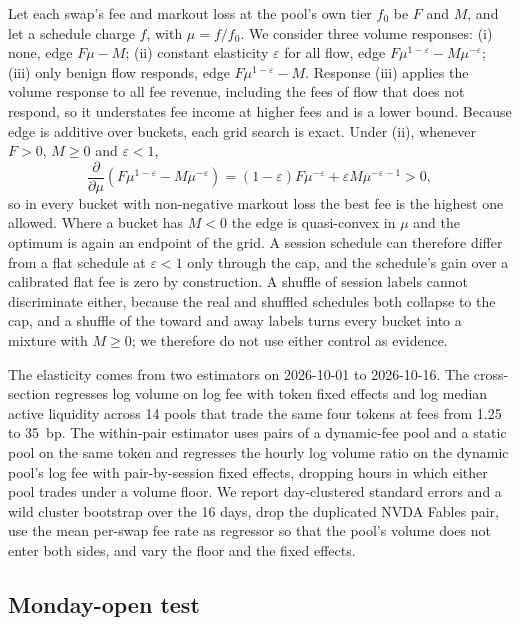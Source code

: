 \documentclass[11pt]{article}
\begin{document}
Let each swap's fee and markout loss at the pool's own tier $f_0$ be $F$ and $M$, and let a schedule charge $f$, with $\mu = f/f_0$. We consider three volume responses: (i) none, edge $F\mu - M$; (ii) constant elasticity $\varepsilon$ for all flow, edge $F\mu^{1-\varepsilon} - M\mu^{-\varepsilon}$; (iii) only benign flow responds, edge $F\mu^{1-\varepsilon} - M$. Response (iii) applies the volume response to all fee revenue, including the fees of flow that does not respond, so it understates fee income at higher fees and is a lower bound. Because edge is additive over buckets, each grid search is exact. Under (ii), whenever $F>0$, $M \geq 0$ and $\varepsilon < 1$,
\begin{equation}
\frac{\partial}{\partial \mu}\left(F\mu^{1-\varepsilon} - M\mu^{-\varepsilon}\right) = (1-\varepsilon) F \mu^{-\varepsilon} + \varepsilon M \mu^{-\varepsilon-1} > 0,
\end{equation}
so in every bucket with non-negative markout loss the best fee is the highest one allowed. Where a bucket has $M<0$ the edge is quasi-convex in $\mu$ and the optimum is again an endpoint of the grid. A session schedule can therefore differ from a flat schedule at $\varepsilon<1$ only through the cap, and the schedule's gain over a calibrated flat fee is zero by construction. A shuffle of session labels cannot discriminate either, because the real and shuffled schedules both collapse to the cap, and a shuffle of the toward and away labels turns every bucket into a mixture with $M \geq 0$; we therefore do not use either control as evidence.

The elasticity comes from two estimators on 2026-10-01 to 2026-10-16. The cross-section regresses log volume on log fee with token fixed effects and log median active liquidity across 14 pools that trade the same four tokens at fees from 1.25 to 35~bp. The within-pair estimator uses pairs of a dynamic-fee pool and a static pool on the same token and regresses the hourly log volume ratio on the dynamic pool's log fee with pair-by-session fixed effects, dropping hours in which either pool trades under a volume floor. We report day-clustered standard errors and a wild cluster bootstrap over the 16 days, drop the duplicated NVDA Fables pair, use the mean per-swap fee rate as regressor so that the pool's volume does not enter both sides, and vary the floor and the fixed effects.

\subsection{Monday-open test}
\end{document}
